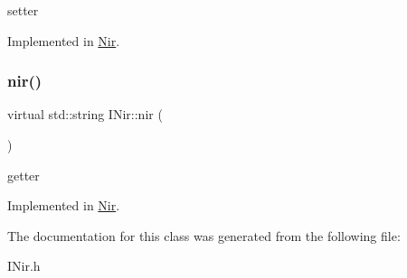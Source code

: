setter 

Implemented in \mbox{\hyperlink{class_nir_a09d504a9f4e4e6db933660a341cb33d1}{Nir}}.

\mbox{\label{class_i_nir_a15730cebcb93aaf847aa46ce976b6557}} 
\subsubsection{\texorpdfstring{nir()}{nir()}\hspace{0.1cm}{\footnotesize\ttfamily [2/2]}}
{\footnotesize\ttfamily virtual std\+::string I\+Nir\+::nir (\begin{DoxyParamCaption}{ }\end{DoxyParamCaption})\hspace{0.3cm}{\ttfamily [pure virtual]}}

getter 

Implemented in \mbox{\hyperlink{class_nir_a5611639ff318800e178396b0fca1a9f3}{Nir}}.



The documentation for this class was generated from the following file\+:\begin{DoxyCompactItemize}
\item 
I\+Nir.\+h\end{DoxyCompactItemize}
